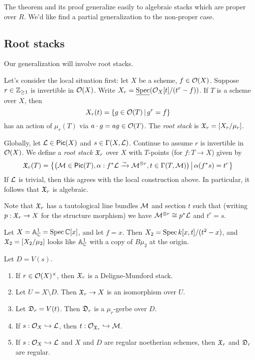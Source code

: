 \documentclass{amsart}
\begin{document}
The theorem and its proof generalize easily to algebraic stacks which are proper over $R$.
We'd like find a partial generalization to the non-proper case.

\subsection{Root stacks}

Our generalization will involve root stacks.

Let's consider the local situation first: let $X$ be a scheme, $f \in \mathcal{O}(X)$.
Suppose $r \in \mathbb{Z}_{\geq 1}$ is invertible in $\mathcal{O}(X)$.
Write $X_r = \underline{\operatorname{Spec}} (\mathcal{O}_X[t] / (t^r - f))$.
If $T$ is a scheme over $X$, then
\[
	X_r(t) = \{ g \in \mathcal{O}(T) \,|\, g^r = f \}
\]
has an action of $\mu_r(T)$ via $a \cdot g = ag \in \mathcal{O}(T)$.
The \emph{root stack} is $\mathfrak{X}_r = [X_r / \mu_r]$.

Globally, let $\mathcal{L} \in \mathsf{Pic}(X)$ and $s \in \Gamma(X, \mathcal{L})$.
Continue to assume $r$ is invertible in $\mathcal{O}(X)$.
We define a \emph{root stack} $\mathfrak{X}_r$ over $X$ with $T$-points (for $f: T \to X$) given by
\[
	\mathfrak{X}_r(T) = \big\{ \big(\mathcal{M} \in \mathsf{Pic}(T), \alpha: f^* \mathcal{L} \xrightarrow{\sim} \mathcal{M}^{\otimes r}, t \in \Gamma(T, \mathcal{M})\big) \,\big|\, \alpha(f^* s) = t^r\big\}
\]
If $\mathcal{L}$ is trivial, then this agrees with the local construction above.
In particular, it follows that $\mathfrak{X}_r$ is algebraic.

Note that $\mathfrak{X}_r$ has a tautological line bundles $\mathcal{M}$ and section $t$ such that (writing $p: \mathfrak{X}_r \to X$ for the structure morphism) we have $\mathcal{M}^{\otimes r} \cong p^* \mathcal{L}$ and $t^r = s$.

\begin{ex}
	Let $X = \mathbb{A}^1_{\mathbb{C}} = \operatorname{Spec} \mathbb{C}[x]$, and let $f = x$.
	Then $X_2 = \operatorname{Spec} k[x, t] / (t^2 - x)$, and $\mathfrak{X}_2 = [X_2 / \mu_2]$ looks like $\mathbb{A}^1_{\mathbb{C}}$ with a copy of $B\mu_2$ at the origin.
\end{ex}

\begin{lem}
	Let $D = V(s)$.
	\begin{enumerate}
		\item If $r \in \mathcal{O}(X)^\times$, then $\mathfrak{X}_r$ is a Deligne-Mumford stack.
		\item Let $U = X \setminus D$.
			Then $\mathfrak{X}_r \to X$ is an isomorphism over $U$.
		\item Let $\mathfrak{D}_r = V(t)$.
			Then $\mathfrak{D}_r$ is a $\mu_r$-gerbe over $D$.
		\item If $s: \mathcal{O}_X \hookrightarrow \mathcal{L}$, then $t: \mathcal{O}_{\mathfrak{X}_r} \hookrightarrow \mathcal{M}$.
		\item If $s: \mathcal{O}_X \hookrightarrow \mathcal{L}$ and $X$ and $D$ are regular noetherian schemes, then $\mathfrak{X}_r$ and $\mathfrak{D}_r$ are regular.
	\end{enumerate}
\end{lem}
\end{document}
